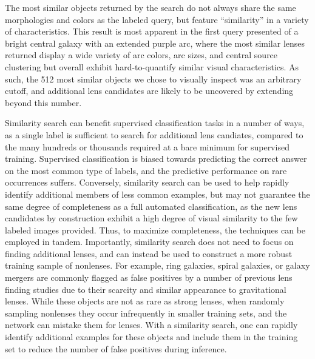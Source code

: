 \documentclass{aastex631}
\begin{document}
The most similar objects returned by the search do not always share the same morphologies and colors as the labeled query, but feature ``similarity'' in a variety of characteristics. This result is most apparent in the first query presented of a bright central galaxy with an extended purple arc, where the most similar lenses returned display a wide variety of arc colors, arc sizes, and central source clustering but overall exhibit hard-to-quantify similar visual characteristics. As such, the 512 most similar objects we chose to visually inspect was an arbitrary cutoff, and additional lens candidates are likely to be uncovered by extending beyond this number.       

Similarity search can benefit supervised classification tasks in a number of ways, as a single label is sufficient to search for additional lens candiates, compared to the many hundreds or thousands required at a bare minimum for supervised training. Supervised classification is biased towards predicting the correct answer on the most common type of labels, and the predictive performance on rare occurrences suffers. Conversely, similarity search can be used to help rapidly identify additional members of less common examples, but may not guarantee the same degree of completeness as a full automated classification, as the new lens candidates by construction exhibit a high degree of visual similarity to the few labeled images provided. Thus, to maximize completeness, the techniques can be employed in tandem. Importantly, similarity search does not need to focus on finding additional lenses, and can instead be used to construct a more robust training sample of nonlenses. For example, ring galaxies, spiral galaxies, or galaxy mergers are commonly flagged as false positives by a number of previous lens finding studies due to their scarcity and similar appearance to gravitational lenses. While these objects are not as rare as strong lenses, when randomly sampling nonlenses they occur infrequently in smaller training sets, and the network can mistake them for lenses. With a similarity search, one can rapidly identify additional examples for these objects and include them in the training set to reduce the number of false positives during inference. 
\end{document}
